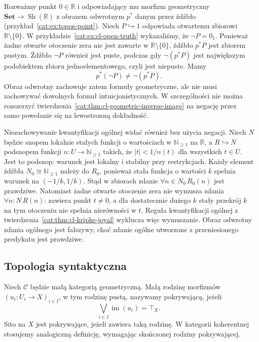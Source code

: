 \begin{przyklad}\label{cat:ex:cl-inverse-image-negation}
Rozważmy punkt $0\in\mathbb R$ i odpowiadający mu morfizm geometryczny $\mathbf{Set}\to\operatorname{Sh}(\mathbb R)$ z obrazem odwrotnym $p^*$ danym przez źdźbło (przykład~\ref{cat:ex:topos-point}). Niech $P\hookrightarrow1$ odpowiada otwartemu zbiorowi $\mathbb R\setminus\{0\}$. W przykładzie~\ref{cat:ex:cl-open-truth} wykazaliśmy, że $\neg P=0_1$. Ponieważ żadne otwarte otoczenie zera nie jest zawarte w $\mathbb R\setminus\{0\}$, źdźbło $p^*P$ jest zbiorem pustym. Źdźbło $\neg P$ również jest puste, podczas gdy $\neg(p^*P)$ jest największym podobiektem zbioru jednoelementowego, czyli jest niepuste. Mamy
\[
 p^*(\neg P)\neq\neg(p^*P).
\]
Obraz odwrotny zachowuje zatem formuły geometryczne, ale nie musi zachowywać dowolnych formuł intuicjonistycznych. W szczególności nie można rozszerzyć twierdzenia~\ref{cat:thm:cl-geometric-inverse-image} na negację przez samo powołanie się na lewostronną dokładność.

Niezachowywanie kwantyfikacji ogólnej widać również bez użycia negacji. Niech $N$ będzie snopem lokalnie stałych funkcji o wartościach w $\mathbb N_{\geq1}$ na $\mathbb R$, a $R\hookrightarrow N$ podsnopem funkcji $n:U\to\mathbb N_{\geq1}$ takich, że $|t|<1/n(t)$ dla wszystkich $t\in U$. Jest to podsnop: warunek jest lokalny i stabilny przy restrykcjach. Każdy element źdźbła $N_0\cong\mathbb N_{\geq1}$ należy do $R_0$, ponieważ stała funkcja o wartości $k$ spełnia warunek na $(-1/k,1/k)$. Stąd w zbiorach zdanie $\forall n\in N_0\,R_0(n)$ jest prawdziwe. Natomiast żadne otwarte otoczenie zera nie wymusza zdania $\forall n:N\,R(n)$: zawiera punkt $t\neq0$, a dla dostatecznie dużego $k$ stały przekrój $k$ na tym otoczeniu nie spełnia nierówności w $t$. Reguła kwantyfikacji ogólnej z twierdzenia~\ref{cat:thm:cl-kripke-joyal} wyklucza więc wymuszanie. Obraz odwrotny zdania ogólnego jest fałszywy, choć zdanie ogólne utworzone z przeniesionego predykatu jest prawdziwe.
\end{przyklad}

\subsection{Topologia syntaktyczna}

\begin{definicja}\label{cat:def:cl-geometric-cover}
Niech $\mathcal C$ będzie małą kategorią geometryczną. Małą rodzinę morfizmów $(u_i:U_i\to X)_{i\in I}$, w tym rodzinę pustą, nazywamy pokrywającą, jeżeli
\[
 \bigvee_{i\in I}\operatorname{im}(u_i)=\top_X.
\]
Sito na $X$ jest pokrywające, jeżeli zawiera taką rodzinę. W kategorii koherentnej stosujemy analogiczną definicję, wymagając skończonej rodziny pokrywającej.
\end{definicja}

